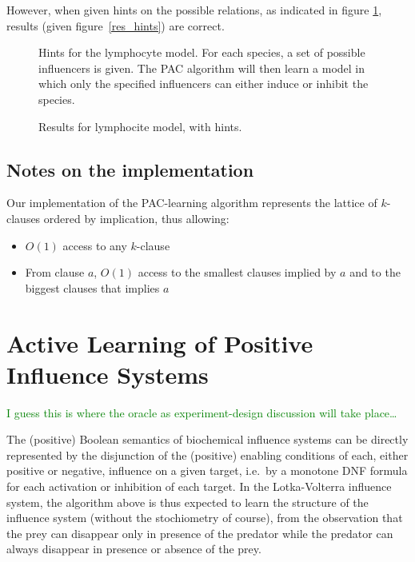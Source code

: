 \documentclass{llncs}
\newcommand{\sylvain}[1]{\textcolor{green}{#1}}
\begin{document}
However, when given hints on the possible relations, as indicated in figure \ref{hints}, results (given figure~\ref{res_hints}) are correct.

\begin{figure}
	
	\caption{Hints for the lymphocyte model. For each species, a set of possible influencers is given. The PAC algorithm will then learn a model in which only the specified influencers can either induce or inhibit the species.\label{hints}}
\end{figure}
\begin{figure}
	
	\caption{Results for lymphocite model, with hints.\label{hints.res}}
\end{figure}

\subsection{Notes on the implementation}

Our implementation of the PAC-learning algorithm represents the lattice of $k$-clauses ordered by implication, thus allowing:
\begin{itemize}
	\item $O(1)$ access to any $k$-clause
	\item From clause $a$, $O(1)$ access to the smallest clauses implied by $a$ and to the biggest clauses that implies $a$
\end{itemize}
\section{Active Learning of Positive Influence Systems}
\label{sec:oracles}

\sylvain{I guess this is where the oracle as experiment-design discussion will
take place\dots}

The (positive) Boolean semantics of biochemical influence systems
can be directly represented by the disjunction of the (positive) enabling conditions of each, either positive or negative, influence on a given target,
i.e.~by a monotone DNF formula for each activation or inhibition of each target.
In the Lotka-Volterra influence system, the algorithm above is thus expected to learn the structure of the influence system
(without the stochiometry of course),
from the observation that the prey can disappear only in presence of the predator
while the predator can always disappear in presence or absence of the prey.
\end{document}
